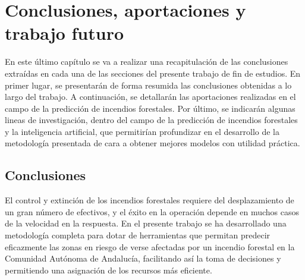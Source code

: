 \documentclass[12pt,a4paper,]{book}
\title{}
\author{Nombre Completo Autor}
\date{18/11/2021}
\def\ifdoblecara{} %
\def\ifprincipal{} %
\let\ifprincipal\undefined %
\numberwithin{dummy}{section}
\theoremstyle{ocrenumbox}
\theoremstyle{blacknumex}
\theoremstyle{blacknumbox}
\theoremstyle{ocrenum}
\theoremstyle{ocrenum}
\begin{document}




\raggedbottom

\ifdefined\ifprincipal
\else
\setlength{\parindent}{1em}
\pagestyle{fancy}
\setcounter{tocdepth}{4}
\tableofcontents

\fi

\ifdefined\ifdoblecara
\fancyhead{}{}
\fancyhead[LE,RO]{\scriptsize\rightmark}
\fancyfoot[LO,RE]{\scriptsize\slshape \leftmark}
\fancyfoot[C]{}
\fancyfoot[LE,RO]{\footnotesize\thepage}
\else
\fancyhead{}{}
\fancyhead[RO]{\scriptsize\rightmark}
\fancyfoot[LO]{\scriptsize\slshape \leftmark}
\fancyfoot[C]{}
\fancyfoot[RO]{\footnotesize\thepage}
\fi

\renewcommand{\headrulewidth}{0.4pt}
\renewcommand{\footrulewidth}{0.4pt}

\hypertarget{conclusiones-aportaciones-y-trabajo-futuro}{%
\chapter{Conclusiones, aportaciones y trabajo
futuro}\label{conclusiones-aportaciones-y-trabajo-futuro}}

En este último capítulo se va a realizar una recapitulación de las
conclusiones extraídas en cada una de las secciones del presente trabajo
de fin de estudios. En primer lugar, se presentarán de forma resumida
las conclusiones obtenidas a lo largo del trabajo. A continuación, se
detallarán las aportaciones realizadas en el campo de la predicción de
incendios forestales. Por último, se indicarán algunas lineas de
investigación, dentro del campo de la predicción de incendios forestales
y la inteligencia artificial, que permitirían profundizar en el
desarrollo de la metodología presentada de cara a obtener mejores
modelos con utilidad práctica.

\hypertarget{conclusiones}{%
\section{Conclusiones}\label{conclusiones}}

El control y extinción de los incendios forestales requiere del
desplazamiento de un gran número de efectivos, y el éxito en la
operación depende en muchos casos de la velocidad en la respuesta. En el
presente trabajo se ha desarrollado una metodología completa para dotar
de herramientas que permitan predecir eficazmente las zonas en riesgo de
verse afectadas por un incendio forestal en la Comunidad Autónoma de
Andalucía, facilitando así la toma de decisiones y permitiendo una
asignación de los recursos más eficiente.
\end{document}
